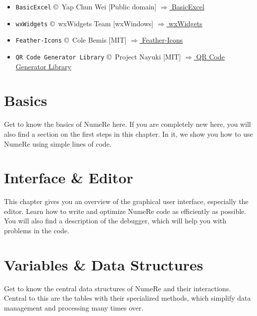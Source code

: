 \documentclass[DIV=17, parskip=half]{scrreprt}
\begin{document}
\begin{itemize}
			\item \verb!BasicExcel! \copyright\ Yap Chun Wei [Public domain]
			\href{https://www.codeproject.com/Articles/13852/BasicExcel-A-Class-to-Read-and-Write-to-Microsoft}{$\Rightarrow$ BasicExcel}

			\item \verb!wxWidgets! \copyright\ wxWidgets Team [wxWindows]
			\href{https://www.wxwidgets.org/}{$\Rightarrow$ wxWidgets}

			\item \verb!Feather-Icons! \copyright\ Cole Bemis [MIT]
			\href{https://feathericons.com/}{$\Rightarrow$ Feather-Icons}

			\item \verb!QR Code Generator Library! \copyright\ Project Nayuki [MIT]
			\href{https://www.nayuki.io/page/qr-code-generator-library}{$\Rightarrow$ QR Code Generator Library}
		\end{itemize}
	\chapter{Basics}
		Get to know the basics of NumeRe here. If you are completely new here, you will also find a section on the first steps in this chapter. In it, we show you how to use NumeRe using simple lines of code.
		
		
		
		
		
		
		
		
		
		
	
	\chapter{Interface \& Editor}
		This chapter gives you an overview of the graphical user interface, especially the editor. Learn how to write and optimize NumeRe code as efficiently as possible. You will also find a description of the debugger, which will help you with problems in the code.
		
		
		
		
		
		
		
		
		
		
		
	\chapter{Variables \& Data Structures}
		Get to know the central data structures of NumeRe and their interactions. Central to this are the tables with their specialized methods, which simplify data management and processing many times over.
		
		
		
		
		
		
		
		
	
\end{document}
